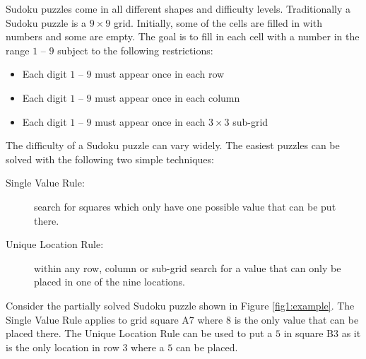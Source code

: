 
Sudoku puzzles come in all different shapes and difficulty levels. Traditionally
a Sudoku puzzle is a $9\times9$ grid. Initially, some of the cells are filled in
with numbers and some are empty. The goal is to fill in each cell with a number
in the range $1$ -- $9$ subject to the following
restrictions:
\begin{itemize}
\item Each digit $1$ -- $9$ must appear once in each row
\item Each digit $1$ -- $9$ must appear once in each column
\item Each digit $1$ -- $9$ must appear once in each $3\times3$ sub-grid
\end{itemize}

The difficulty of a Sudoku puzzle can vary widely. The easiest puzzles can be solved with the following two simple techniques: \begin{description}
\item[Single Value Rule:] search for squares which only have one possible value that can be put there.
\item[Unique Location Rule:] within any row, column or sub-grid search for a value that can only be placed in one of the nine locations.
\end{description}
Consider the partially solved Sudoku puzzle shown in Figure \ref{fig1:example}.  The Single Value Rule applies to grid square A$7$ where $8$ is the only value that can be placed there.  The Unique Location Rule can be used to put a $5$ in square B$3$ as it is the only location in row $3$ where a $5$ can be placed.

